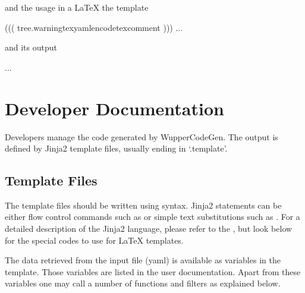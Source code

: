 \documentclass[letterpaper,10pt,english]{sphinxmanual}
\begin{document}
and the usage in a LaTeX the template

\begin{sphinxVerbatim}[commandchars=\\\{\}]
((( tree.warning\textbar{}texyamlencode\textbar{}texcomment )))
...
\end{sphinxVerbatim}

and its output

\begin{sphinxVerbatim}[commandchars=\\\{\}]
...
\end{sphinxVerbatim}


\section{Developer Documentation}
\label{\detokenize{developer:developer-documentation}}\label{\detokenize{developer::doc}}
Developers manage the code generated by WupperCodeGen. The output is defined by
Jinja2 template files, usually ending in `.template'.


\subsection{Template Files}
\label{\detokenize{developer:template-files}}
The template files should be written using 
syntax. Jinja2 statements can be either flow control commands such as  or simple text substitutions such as . For a
detailed description of the Jinja2 language, please refer to the , but look below for the
special codes to use for LaTeX templates.

The data retrieved from the input file (yaml) is available as variables in the
template. Those variables are listed in the user documentation. Apart from these
variables one may call a number of functions and filters as explained below.
\end{document}
